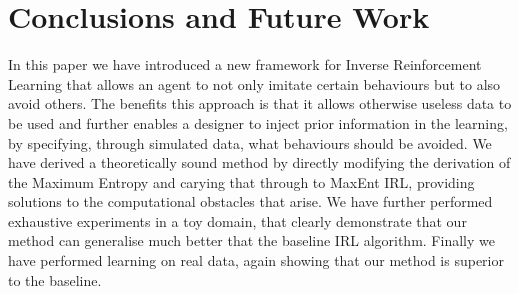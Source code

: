 \documentclass[letterpaper]{article}
\begin{document}
\section{Conclusions and Future Work}
In this paper we have introduced a new framework for Inverse Reinforcement Learning that allows an agent to not only imitate certain behaviours but to also avoid others. The benefits this approach is that it allows otherwise useless data to be used and further enables a designer to inject prior information in the learning, by specifying, through simulated data, what behaviours should be avoided. We have derived a theoretically sound method by directly modifying the derivation of the Maximum Entropy and carying that through to MaxEnt IRL, providing solutions to the computational obstacles that arise. We have further performed exhaustive experiments in a toy domain, that clearly demonstrate that our method can generalise much better that the baseline IRL algorithm. Finally we have performed learning on real data, again showing that our method is superior to the baseline.  







	
\end{document}
